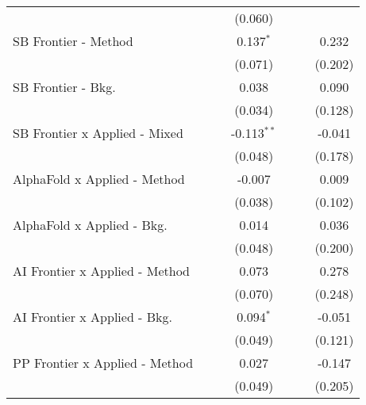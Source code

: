 \begin{tabular}{lcccccc}
                                  &               &         & (0.060)       &              &         &   \\   
   SB Frontier - Method           &               &         & 0.137$^{*}$   &              &         & 0.232\\   
                                  &               &         & (0.071)       &              &         & (0.202)\\   
   SB Frontier - Bkg.             &               &         & 0.038         &              &         & 0.090\\   
                                  &               &         & (0.034)       &              &         & (0.128)\\   
   SB Frontier x Applied - Mixed  &               &         & -0.113$^{**}$ &              &         & -0.041\\   
                                  &               &         & (0.048)       &              &         & (0.178)\\   
   AlphaFold x Applied - Method   &               &         & -0.007        &              &         & 0.009\\   
                                  &               &         & (0.038)       &              &         & (0.102)\\   
   AlphaFold x Applied - Bkg.     &               &         & 0.014         &              &         & 0.036\\   
                                  &               &         & (0.048)       &              &         & (0.200)\\   
   AI Frontier x Applied - Method &               &         & 0.073         &              &         & 0.278\\   
                                  &               &         & (0.070)       &              &         & (0.248)\\   
   AI Frontier x Applied - Bkg.   &               &         & 0.094$^{*}$   &              &         & -0.051\\   
                                  &               &         & (0.049)       &              &         & (0.121)\\   
   PP Frontier x Applied - Method &               &         & 0.027         &              &         & -0.147\\   
                                  &               &         & (0.049)       &              &         & (0.205)\\   

\end{tabular}
